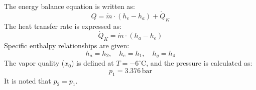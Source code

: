 The energy balance equation is written as:  
\[
Q = \dot{m} \cdot \left(h_e - h_a\right) + \dot{Q}_K
\]  
The heat transfer rate is expressed as:  
\[
\dot{Q}_K = \dot{m} \cdot \left(h_a - h_e\right)
\]  
Specific enthalpy relationships are given:  
\[
h_a = h_2, \quad h_e = h_1, \quad h_g = h_4
\]  
The vapor quality (\(x_0\)) is defined at \(T = -6^\circ\text{C}\), and the pressure is calculated as:  
\[
p_1 = 3.376 \, \text{bar}
\]  
It is noted that \(p_2 = p_1\).